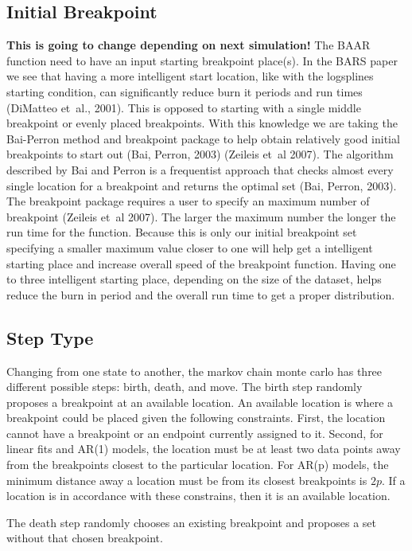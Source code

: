 \documentclass[submit]{smj}
\begin{document}
\subsection{Initial Breakpoint}
\textbf{This is going to change depending on next simulation!}
The BAAR function need to have an input starting breakpoint place(s). In the BARS paper we see that having a more intelligent start location, like with the logsplines starting condition, can significantly reduce burn it periods and run times (DiMatteo et~al., 2001). This is opposed to starting with a single middle breakpoint or evenly placed breakpoints. With this knowledge we are taking the Bai-Perron method and breakpoint package to help obtain relatively good initial breakpoints to start out (Bai, Perron, 2003) (Zeileis et~al 2007). The algorithm described by Bai and Perron is a frequentist approach that checks almost every single location for a breakpoint and returns the optimal set (Bai, Perron, 2003). The breakpoint package requires a user to specify an maximum number of breakpoint (Zeileis et~al 2007). The larger the maximum number the longer the run time for the function. Because this is only our initial breakpoint set specifying a smaller maximum value closer to one will help get a intelligent starting place and increase overall speed of the breakpoint function. Having one to three intelligent starting place, depending on the size of the dataset, helps reduce the burn in period and the overall run time to get a proper distribution. 

\subsection{Step Type}
Changing from one state to another, the markov chain monte carlo has three different possible steps: birth, death, and move. The birth step randomly proposes a breakpoint at an available location. An available location is where a breakpoint could be placed given the following constraints. First, the location cannot have a breakpoint or an endpoint currently assigned to it. Second, for linear fits and AR(1) models, the location must be at least two data points away from the breakpoints closest to the particular location. For AR(p) models, the minimum distance away a location must be from its closest breakpoints is $2p$. If a location is in accordance with these constrains, then it is an available location.  

The death step randomly chooses an existing breakpoint and proposes a set without that chosen breakpoint. 
\end{document}
